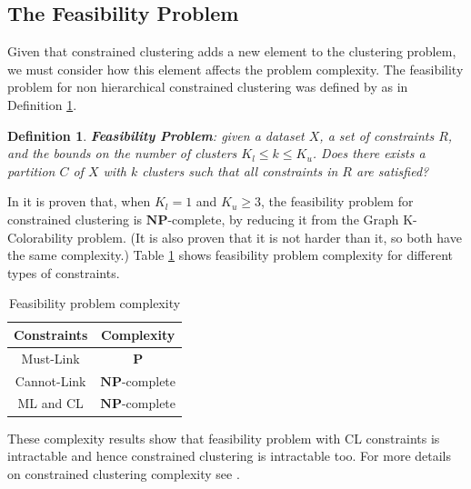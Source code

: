 \documentclass[review]{elsarticle}
\newtheorem{definition}{Definition}
\begin{document}
\subsection{The Feasibility Problem}

Given that constrained clustering adds a new element to the clustering problem, we must consider how this element affects the problem complexity. The feasibility problem for non hierarchical constrained clustering was defined by \cite{davidson2005clustering} as in Definition \ref{def1}.

\begin{definition}
	
	\textbf{Feasibility Problem}: given a dataset $X$, a set of constraints $R$, and the bounds on the number of clusters $K_l \leq k \leq K_u$. Does there exists a partition $C$ of $X$ with $k$ clusters such that all constraints in $R$ are satisfied? \cite{davidson2007survey}\cite{davidson2005clustering}
	\label{def1}
	
\end{definition}

In \cite{davidson2005clustering} it is proven that, when $K_l = 1$ and $K_u \ge 3$, the feasibility problem for constrained clustering is $\mathbf{NP}$-complete, by reducing it from the Graph K-Colorability problem. (It is also proven that it is not harder than it, so both have the same complexity.) Table \ref{tab:feasibility} shows feasibility problem complexity for different types of constraints.

\begin{table}[!h]
	\centering
	\setlength{\tabcolsep}{7pt}
	\renewcommand{\arraystretch}{1.2}
		\begin{tabular}{c c}
			\hline
			Constraints & Complexity \\
			\hline
			Must-Link & $\mathbf{P}$\\
			Cannot-Link & $\mathbf{NP}$-complete\\
			ML and CL & $\mathbf{NP}$-complete\\
			\hline
			
		\end{tabular}%
	\caption{Feasibility problem complexity \cite{davidson2005clustering}}
	\label{tab:feasibility}
\end{table}

These complexity results show that feasibility problem with CL constraints is intractable and hence constrained clustering is intractable too. For more details on constrained clustering complexity see \cite{davidson2005clustering}.
\end{document}

